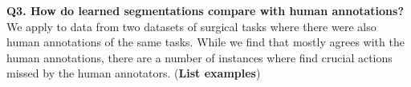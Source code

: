 \textbf{Q3. How do learned segmentations compare with human annotations? } 
We apply \sys to data from two datasets of surgical tasks \cite{gao2014jigsaws} where there were also human annotations of the same tasks.
While we find that \sys mostly agrees with the human annotations, there are a number of instances where \sys find crucial actions missed by the human annotators. (\textbf{List examples}) 

